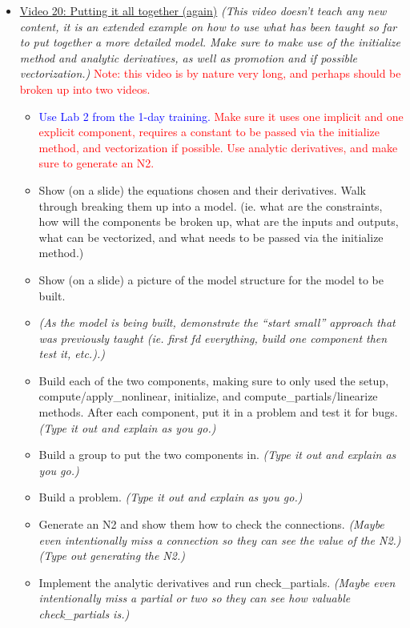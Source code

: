 \documentclass[12pt, letterpaper]{article}
\begin{document}
\begin{itemize}
	\item \underline{Video 20: Putting it all together (again)} \textit{(This video doesn’t teach any new content, it is an extended example on how to use what has been taught so far to put together a more detailed model. Make sure to make use of the initialize method and analytic derivatives, as well as promotion and if possible vectorization.)} \textcolor{red}{Note: this video is by nature very long, and perhaps should be broken up into two videos.}
		\begin{itemize}
			\item \textcolor{blue}{Use Lab 2 from the 1-day training.} \textcolor{red}{Make sure it uses one implicit and one explicit component, requires a constant to be passed via the initialize method, and vectorization if possible. Use analytic derivatives, and make sure to generate an N2.}
			\item Show (on a slide) the equations chosen and their derivatives. Walk through breaking them up into a model. (ie. what are the constraints, how will the components be broken up, what are the inputs and outputs, what can be vectorized, and what needs to be passed via the initialize method.)
			\item Show (on a slide) a picture of the model structure for the model to be built.
			\item \textit{(As the model is being built, demonstrate the ``start small'' approach that was previously taught (ie. first fd everything, build one component then test it, etc.).)}
			\item Build each of the two components, making sure to only used the setup, compute/apply\_nonlinear, initialize, and compute\_partials/linearize methods. After each component, put it in a problem and test it for bugs. \textit{(Type it out and explain as you go.)}
			\item Build a group to put the two components in. \textit{(Type it out and explain as you go.)}
			\item Build a problem. \textit{(Type it out and explain as you go.)}
			\item Generate an N2 and show them how to check the connections. \textit{(Maybe even intentionally miss a connection so they can see the value of the N2.)} \textit{(Type out generating the N2.)}
			\item Implement the analytic derivatives and run check\_partials. \textit{(Maybe even intentionally miss a partial or two so they can see how valuable check\_partials is.)}

\end{itemize}
\end{itemize}
\end{document}

